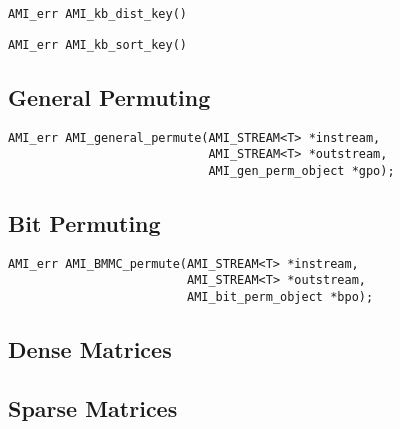 \begin{verbatim}
AMI_err AMI_kb_dist_key()
\end{verbatim}

\begin{verbatim}
AMI_err AMI_kb_sort_key()
\end{verbatim}


\subsection{General Permuting}


\tobeextended

\begin{verbatim}
AMI_err AMI_general_permute(AMI_STREAM<T> *instream, 
                            AMI_STREAM<T> *outstream, 
                            AMI_gen_perm_object *gpo);
\end{verbatim}

\subsection{Bit Permuting}


\tobeextended

\begin{verbatim}
AMI_err AMI_BMMC_permute(AMI_STREAM<T> *instream, 
                         AMI_STREAM<T> *outstream, 
                         AMI_bit_perm_object *bpo);
\end{verbatim}

\subsection{Dense Matrices}


\tobewritten


\subsection{Sparse Matrices}


\tobewritten

